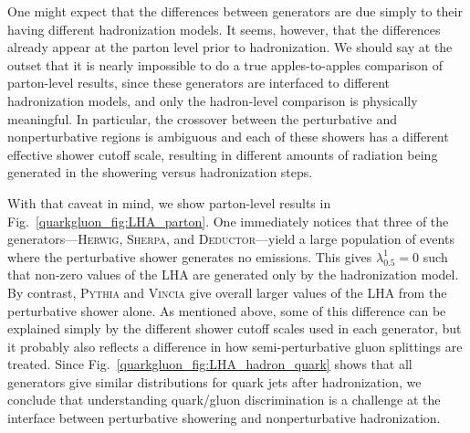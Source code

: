 \documentclass[11pt]{cernrep}
\begin{document}
One might expect that the differences between generators are due
simply to their having different hadronization models.  It seems,
however, that the differences already appear at the parton level prior
to hadronization. We should say at the outset that it is nearly impossible to do a true apples-to-apples comparison of parton-level results, since these generators are interfaced to different hadronization models, and only the hadron-level comparison is physically meaningful.  In particular, the crossover between the perturbative and nonperturbative regions is ambiguous and each of these showers has a different effective shower cutoff scale, resulting in different amounts of radiation being generated in the showering versus hadronization steps.

With that caveat in mind, we show parton-level results in Fig.~\ref{quarkgluon_fig:LHA_parton}.  One immediately notices that three of the
generators---\textsc{Herwig}, \textsc{Sherpa}, and
\textsc{Deductor}---yield a large population of events where the
perturbative shower generates no emissions.  This gives
$\lambda_{0.5}^1 = 0$ such that non-zero values of the LHA are
generated only by the hadronization model.  By contrast,
\textsc{Pythia} and \textsc{Vincia} give overall larger values of the
LHA from the perturbative shower alone.  As mentioned above, some of this difference can be explained simply by the different shower cutoff scales used in each generator, but it probably also reflects a difference in how semi-perturbative gluon splittings are treated.  Since Fig.~\ref{quarkgluon_fig:LHA_hadron_quark} shows that all generators give similar distributions for quark jets after hadronization, we
conclude that understanding quark/gluon discrimination is a challenge
at the interface between perturbative showering and nonperturbative
hadronization.
\end{document}
